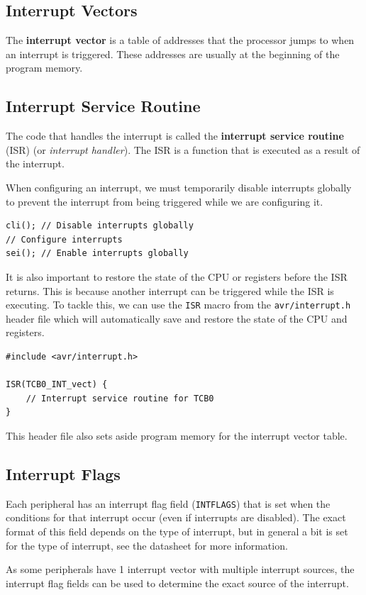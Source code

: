 \documentclass{report}
\begin{document}
\subsection{Interrupt Vectors}
The \textbf{interrupt vector} is a table of addresses that the processor jumps to when an interrupt is triggered.
These addresses are usually at the beginning of the program memory.
\subsection{Interrupt Service Routine}
The code that handles the interrupt is called the \textbf{interrupt service routine} (ISR) (or \textit{interrupt handler}).
The ISR is a function that is executed as a result of the interrupt.

When configuring an interrupt, we must temporarily disable interrupts globally to prevent the interrupt from being triggered while we are configuring it.
\begin{verbatim}
cli(); // Disable interrupts globally
// Configure interrupts
sei(); // Enable interrupts globally
\end{verbatim}
It is also important to restore the state of the CPU or registers before the ISR returns.
This is because another interrupt can be triggered while the ISR is executing.
To tackle this, we can use the \texttt{ISR} macro from the \texttt{avr/interrupt.h}
header file which will automatically save and restore the state of the CPU and registers.
\begin{verbatim}
#include <avr/interrupt.h>

ISR(TCB0_INT_vect) {
    // Interrupt service routine for TCB0
}
\end{verbatim}
This header file also sets aside program memory for the interrupt vector table.
\subsection{Interrupt Flags}
Each peripheral has an interrupt flag field (\texttt{INTFLAGS}) that is set when the conditions
for that interrupt occur (even if interrupts are disabled).
The exact format of this field depends on the type of interrupt, but in general a bit is
set for the type of interrupt, see the datasheet for more information.

As some peripherals have 1 interrupt vector with multiple interrupt sources,
the interrupt flag fields can be used to determine the exact source of the interrupt.
\end{document}

